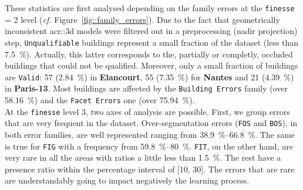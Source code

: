         These statistics are first analysed depending on the family errors at the \texttt{finesse} = 2 level (\textit{cf.} Figure~\ref{fig::family_errors}).
        Due to the fact that geometrically inconsistent \gls{acr::3d} models were filtered out in a preprocessing (nadir projection) step, \texttt{Unqualifiable} buildings represent a small fraction of the dataset (less than \SI{7.5}{\percent}).
        Actually, this latter corresponds to the, partially or completly, occluded buildings that could not be qualified.
        Moreover, only a small fraction of buildings are \texttt{Valid}:
        57 (\SI{2.84}{\percent}) in \textbf{Elancourt}, 55 (\SI{7.35}{\percent}) for \textbf{Nantes} and 21 (\SI{4.39}{\percent}) in \textbf{Paris-13}.
        Most buildings are affected by the \texttt{Building Errors} family (over \SI{58.16}{\percent}) and the \texttt{Facet Errors} one (over \SI{75.94}{\percent}).\\

        At the \texttt{finesse} level 3, two axes of analysis are possible.
        First, we group errors that are very frequent in the dataset.
        Over-segmentation errors (\texttt{FOS} and \texttt{BOS}), in both error families, are well represented ranging from \SIrange{38.9}{66.8}{\percent}.
        The same is true for \texttt{FIG} with a frequency from \SIrange{59.8}{80}{\percent}.
        \texttt{FIT}, on the other hand, are very rare in all the areas with ratios a little less than \SI{1.5}{\percent}.
        The rest have a presence ratio within the percentage interval of [10, 30].
        The errors that are rare are understandably going to impact negatively the learning process.\\
        
